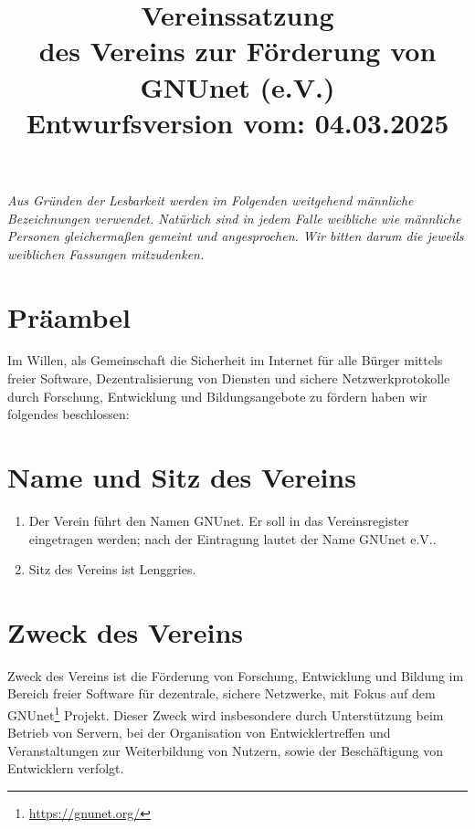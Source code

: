 \documentclass[german,a4paper]{article} %
\title{Vereinssatzung\\des Vereins zur F\"orderung von GNUnet (e.V.)\\\small{Entwurfsversion vom: 04.03.2025}}
\date{}
\newenvironment{enumpar}{%
  \renewcommand{\labelenumi}{\theenumi}%
  \renewcommand{\theenumi}{(\arabic{enumi})}%
  \renewcommand{\labelenumii}{\theenumii}%
  \renewcommand{\theenumii}{(\alph{enumii})}%
  \begin{enumerate}}
{\end{enumerate}}
\begin{document}
\maketitle \textit{\small{Aus Gründen der Lesbarkeit werden im
    Folgenden weitgehend männliche Bezeichnungen verwendet. Natürlich
    sind in jedem Falle weibliche wie männliche Personen gleichermaßen
    gemeint und angesprochen. Wir bitten darum die jeweils weiblichen
    Fassungen mitzudenken.}}

\section*{Präambel}
Im Willen, als Gemeinschaft die Sicherheit im Internet f\"ur alle
B\"urger mittels freier Software, Dezentralisierung von Diensten und
sichere Netzwerkprotokolle durch Forschung, Entwicklung und
Bildungsangebote zu f\"ordern haben wir folgendes beschlossen: \par

\section{Name und Sitz des Vereins}
\begin{enumpar}

\item Der Verein führt den Namen \glqq GNUnet\grqq . Er soll in das Vereinsregister eingetragen werden; nach der Eintragung lautet der Name \glqq GNUnet e.V.\grqq.
\item Sitz des Vereins ist Lenggries.
\end{enumpar}

\section{Zweck des Vereins}

Zweck des Vereins ist die F\"orderung von Forschung, Entwicklung und
Bildung im Bereich freier Software f\"ur dezentrale, sichere Netzwerke,
mit Fokus auf dem GNUnet\footnote{\url{https://gnunet.org/}} Projekt.  Dieser
Zweck wird insbesondere durch Unterst\"utzung beim Betrieb
von Servern, bei der Organisation von Entwicklertreffen und
Veranstaltungen zur Weiterbildung von Nutzern, sowie der
Besch\"aftigung von Entwicklern verfolgt.
\end{document}
